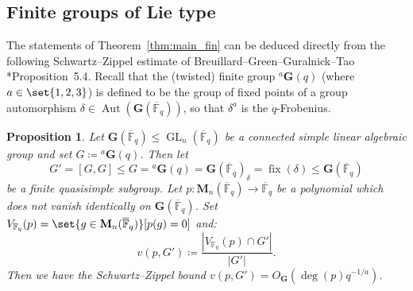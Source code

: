 \documentclass[a4paper,12pt]{amsproc}
\newcommand{\card}[1]{\left\lvert#1\right\rvert}%
\DeclareMathOperator{\GL}{GL}%
\DeclareMathOperator{\Aut}{Aut}
\DeclareMathOperator{\fix}{fix}%
\theoremstyle{plain}
\newtheorem{proposition}[definition]{Proposition}
\theoremstyle{definition}
\begin{document}

\subsection{Finite groups of Lie type}

The statements of Theorem~\ref{thm:main_fin} can be deduced directly from the following Schwartz--Zippel estimate of Breuillard--Green--Guralnick--Tao \cite{breuillardgreenguralnicktao2015expansion}*{Proposition~5.4}. Recall that the (twisted) finite group ${}^a\mathbf{G}(q)$ (where $a\in\set{1,2,3}$) is defined to be the group of fixed points of a group automorphism $\delta\in\Aut(\mathbf{G}(\overline{\mathbb{F}}_q))$, so that $\delta^a$ is the $q$-Frobenius.

\begin{proposition} \label{BreGreGurTaoProp}
Let $\mathbf{G}(\overline{\mathbb{F}}_q)\leq\GL_n(\overline{\mathbb{F}}_q)$ be a connected simple linear algebraic group and set $G\coloneqq{}^a\mathbf{G}(q)$. Then let
$$G'=[G,G]\leq G={}^a\mathbf{G}(q)=\mathbf{G}(\overline{\mathbb{F}}_q)_\delta=\fix(\delta)\leq\mathbf{G}(\overline{\mathbb{F}}_q)$$ 
be a finite quasisimple subgroup. Let $p\colon\mathbf{M}_n(\overline{\mathbb{F}}_q)\rightarrow\overline{\mathbb{F}}_q$ be a polynomial which does not vanish identically on $\mathbf{G}(\overline{\mathbb{F}}_q)$. Set $V_{\mathbb{F}_q}(p)=\set{g \in \mathbf{M}_n(\overline{\mathbb{F}}_q)}[p(g)=0]$ 
and: 
$$
v(p,G')\coloneqq\frac{\card{V_{\mathbb{F}_q}(p)\cap G'}}{\card{G'}}.
$$
Then we have the Schwartz--Zippel bound $v(p,G')=O_{\mathbf{G}}(\deg(p)q^{-1/a})$.
\end{proposition}
\end{document}
